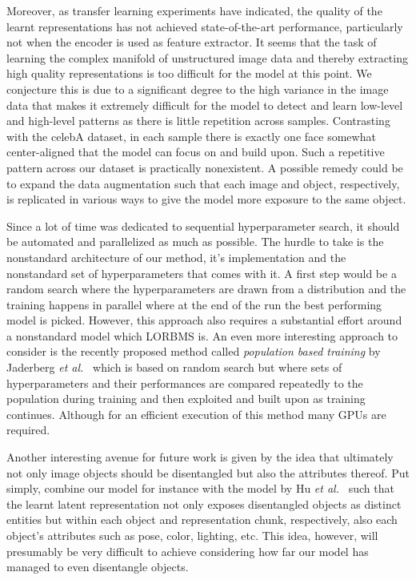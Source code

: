 \documentclass[a4paper,12pt]{report}
\begin{document}
Moreover, as transfer learning experiments have indicated, the quality of the learnt representations has not achieved state-of-the-art performance, particularly not when the encoder is used as feature extractor. It seems that the task of learning the complex manifold of unstructured image data and thereby extracting high quality representations is too difficult for the model at this point. We conjecture this is due to a significant degree to the high variance in the image data that makes it extremely difficult for the model to detect and learn low-level and high-level patterns as there is little repetition across samples. Contrasting with the celebA dataset, in each sample there is exactly one face somewhat center-aligned that the model can focus on and build upon. Such a repetitive pattern across our dataset is practically nonexistent. A possible remedy could be to expand the data augmentation such that each image and object, respectively, is replicated in various ways to give the model more exposure to the same object.

Since a lot of time was dedicated to sequential hyperparameter search, it should be automated and parallelized as much as possible. The hurdle to take is the nonstandard architecture of our method, it's implementation and the nonstandard set of hyperparameters that comes with it. A first step would be a random search where the hyperparameters are drawn from a distribution and the training happens in parallel where at the end of the run the best performing model is picked. However, this approach also requires a substantial effort around a nonstandard model which LORBMS is. An even more interesting approach to consider is the recently proposed method called \textit{population based training} by Jaderberg \textit{et al.}~\cite{PopBasedTraining} which is based on random search but where sets of hyperparameters and their performances are compared repeatedly to the population during training and then exploited and built upon as training continues. Although for an efficient execution of this method many GPUs are required. 

Another interesting avenue for future work is given by the idea that ultimately not only image objects should be disentangled but also the attributes thereof. Put simply, combine our model for instance with the model by Hu \textit{et al.}~\cite{DisentFacOfVarByMixTh} such that the learnt latent representation not only exposes disentangled objects as distinct entities but within each object and representation chunk, respectively, also each object's attributes such as pose, color, lighting, etc. This idea, however, will presumably be very difficult to achieve considering how far our model has managed to even disentangle objects.
\end{document}
